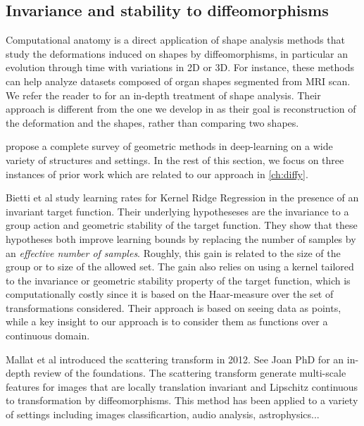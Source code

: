 \subsection{Invariance and stability to diffeomorphisms}

Computational anatomy is a direct application of shape analysis methods that study the deformations induced on shapes by diffeomorphisms, in particular an evolution through time with variations in 2D or 3D. For instance, these methods can help analyze datasets composed of organ shapes segmented from MRI scan. We refer the reader to \cite{younes} for an in-depth treatment of shape analysis. Their approach is different from the one we develop in \cite{ch:diffy} as their goal is reconstruction of the deformation and the shapes, rather than comparing two shapes.

\cite{bronstein-geometric-deep-learning} propose a complete survey of geometric methods in deep-learning on a wide variety of structures and settings. In the rest of this section, we focus on three instances of prior work which are related to our approach in \cref{ch:diffy}.

Bietti et al study learning rates for Kernel Ridge Regression in the presence of an invariant target function. Their underlying hypotheseses are the invariance to a group action and geometric stability of the target function. They show that these hypotheses both improve learning bounds by replacing the number of samples by an \emph{effective number of samples}. Roughly, this gain is related to the size of the group or to size of the allowed set. The gain also relies on using a kernel tailored to the invariance or geometric stability property of the target function, which is computationally costly since it is based on the Haar-measure over the set of transformations considered. Their approach is based on seeing data as points, while a key insight to our approach is to consider them as functions over a continuous domain.

Mallat et al introduced the scattering transform in 2012. See Joan PhD for an in-depth review of the foundations. The scattering transform generate multi-scale features for images that are locally translation invariant and Lipschitz continuous to transformation by diffeomorphisms. This method has been applied to a variety of settings including images classificartion, audio analysis, astrophysics...

